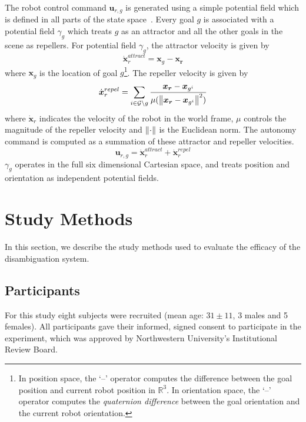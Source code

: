 The robot control command $\boldsymbol{u}_{r,g}$ is generated using a simple potential field which is defined in all parts of the state space~\cite{khatib1986real}. Every goal $g$ is associated with a potential field $\gamma_g$ which treats $g$ as an attractor and all the other goals in the scene as repellers. For potential field $\gamma_g$, the attractor velocity is given by
\begin{equation*}
\dot{\boldsymbol{x}}_r^{attract} = \boldsymbol{x}_{g} - \boldsymbol{x_r}
\end{equation*}
where $\boldsymbol{x}_{g}$ is the location of goal $g$\footnote{In position space, the `--' operator computes the difference between the goal position and current robot position in $\mathbb{R}^3$. In orientation space, the `--' operator computes the \textit{quaternion difference} between the goal orientation and the current robot orientation.}. The repeller velocity is given by
\begin{equation*}
\dot{\boldsymbol{x}}_r^{repel} = \sum_{i \in \mathcal{G} \setminus g} \frac{\boldsymbol{x_r} - \boldsymbol{x}_{g^i}}{\mu(\left\lVert\boldsymbol{x_r} - \boldsymbol{x}_{g^i}\right\rVert^2)}
\end{equation*}
where $\dot{\boldsymbol{x}}_r$ indicates the velocity of the robot in the world frame, $\mu$ controls the magnitude of the repeller velocity and $\left\lVert\cdot\right\rVert$ is the Euclidean norm. The autonomy command is computed as a summation of these attractor and repeller velocities.
\begin{equation*}
\boldsymbol{u}_{r,g} = \dot{\boldsymbol{x}}_r^{attract} + \dot{\boldsymbol{x}}_r^{repel} 
\end{equation*}
$\gamma_g$ operates in the full six dimensional Cartesian space, and treats position and orientation as independent potential fields. 

\section{Study Methods}\label{sec:ed}
In this section, we describe the study methods used to evaluate the efficacy of the disambiguation system. 
\subsection{Participants}
For this study eight subjects were recruited (mean age: $31 \pm 11$, 3 males and 5 females). All participants gave their informed, signed consent to participate in the experiment, which was approved by Northwestern University's Institutional Review Board.
